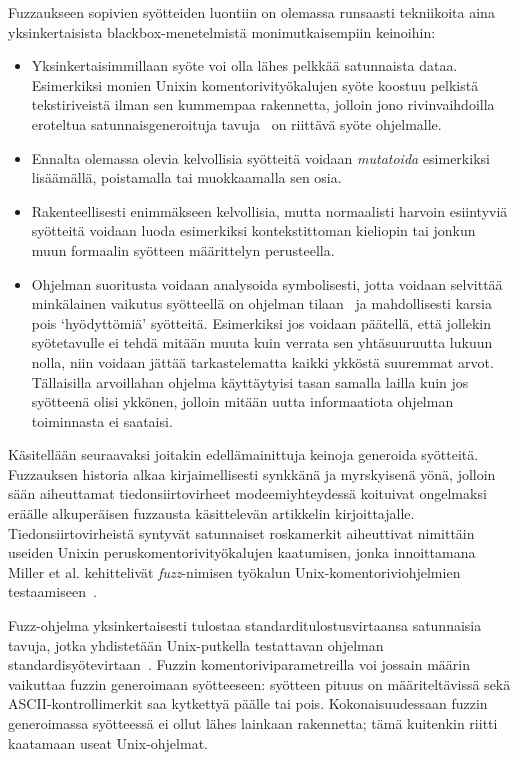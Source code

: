 Fuzzaukseen sopivien syötteiden luontiin on olemassa runsaasti tekniikoita
aina yksinkertaisista blackbox-menetelmistä monimutkaisempiin keinoihin:
\begin{itemize}
    \item Yksinkertaisimmillaan syöte voi olla lähes pelkkää satunnaista dataa.
          Esimerkiksi monien Unixin komentorivityökalujen syöte koostuu pelkistä tekstiriveistä
          ilman sen kummempaa rakennetta,
          jolloin jono rivinvaihdoilla eroteltua satunnaisgeneroituja
          tavuja~\cite{UnixReliability} on riittävä syöte ohjelmalle.
    \item Ennalta olemassa olevia kelvollisia syötteitä voidaan \emph{mutatoida} esimerkiksi
          lisäämällä, poistamalla tai muokkaamalla sen osia.
    \item Rakenteellisesti enimmäkseen kelvollisia, mutta normaalisti harvoin esiintyviä syötteitä voidaan
          luoda esimerkiksi kontekstittoman kieliopin tai jonkun muun formaalin syötteen määrittelyn perusteella.
    \item Ohjelman suoritusta voidaan analysoida symbolisesti, jotta voidaan
          selvittää minkälainen vaikutus syötteellä on ohjelman tilaan~\cite{SageArtikkeli}
          ja mahdollisesti karsia pois `hyödyttömiä' syötteitä.
          Esimerkiksi jos voidaan päätellä, että jollekin syötetavulle ei tehdä mitään muuta kuin
          verrata sen yhtäsuuruutta lukuun nolla,
          niin voidaan jättää tarkastelematta kaikki ykköstä suuremmat arvot.
          Tällaisilla arvoillahan ohjelma käyttäytyisi tasan samalla lailla
          kuin jos syötteenä olisi ykkönen,
          jolloin mitään uutta informaatiota ohjelman toiminnasta ei saataisi.

\end{itemize}

Kä\-si\-tel\-lään seuraavaksi joitakin e\-del\-lä\-mai\-nit\-tu\-ja keinoja generoida syötteitä.
Fuzzauksen historia alkaa kirjaimellisesti synkkänä ja myrskyisenä yönä,
jolloin sään aiheuttamat tiedonsiirtovirheet modeemiyhteydessä koituivat ongelmaksi
eräälle alkuperäisen fuzzausta käsittelevän artikkelin kirjoittajalle\cite{UnixReliability}.
Tiedonsiirtovirheistä syntyvät satunnaiset roskamerkit aiheuttivat nimittäin
useiden Unixin peruskomentorivityökalujen kaatumisen,
jonka innoittamana Miller et al. kehittelivät \emph{fuzz}-nimisen työkalun Unix-komentoriviohjelmien testaamiseen~\cite{UnixReliability}.

Fuzz-ohjelma yksinkertaisesti tulostaa standarditulostusvirtaansa satunnaisia tavuja,
jotka yhdistetään Unix-putkella testattavan ohjelman standardisyötevirtaan~\cite{UnixReliability}.
Fuzzin komentoriviparametreilla voi jossain määrin vaikuttaa fuzzin generoimaan syötteeseen:
syötteen pituus on määriteltävissä sekä ASCII-kontrollimerkit saa kytkettyä päälle tai pois.
Kokonaisuudessaan fuzzin generoimassa syötteessä ei ollut lähes lainkaan rakennetta;
tämä kuitenkin riitti kaatamaan useat Unix-ohjelmat.

